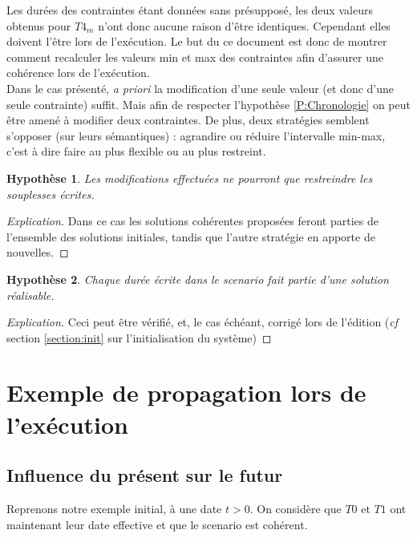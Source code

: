 \documentclass[10pt,a4paper]{article}
\newtheorem{presup}{Hypothèse}
\newcommand{\hyporef}[1]{l'hypothèse \ref{#1}}
\begin{document}
Les durées des contraintes étant données sans présupposé, les deux valeurs obtenus pour $T4_m$ n'ont donc aucune raison d'être identiques. Cependant elles doivent l'être lors de l'exécution. Le but du ce document est donc de montrer comment recalculer les valeurs min et max des contraintes afin d'assurer une cohérence lors de l'exécution.\\

Dans le cas présenté, \textit{a priori} la modification d'une seule valeur (et donc d'une seule contrainte) suffit. Mais afin de respecter \hyporef{P:Chronologie} on peut être amené à modifier deux contraintes. De plus, deux stratégies semblent s'opposer (sur leurs sémantiques) : agrandire ou réduire l'intervalle min-max, c'est à dire faire au plus flexible ou au plus restreint.

	\begin{presup}
		Les modifications effectuées ne pourront que restreindre les souplesses écrites. \label{P:modif}
	\end{presup}
	\begin{proof}[Explication]
		Dans ce cas les solutions cohérentes proposées feront parties de l'ensemble des solutions initiales, tandis que l'autre stratégie en apporte de nouvelles.
	\end{proof}

	\begin{presup}
		Chaque durée écrite dans le scenario fait partie d'une solution réalisable. \label{P:coherent}
	\end{presup}
	\begin{proof}[Explication]
		Ceci peut être vérifié, et, le cas échéant, corrigé lors de l'édition (\textit{cf} section \ref{section:init} sur l'initialisation du système)
	\end{proof}


\section{Exemple de propagation lors de l'exécution}

	\subsection{Influence du présent sur le futur}
Reprenons notre exemple initial, à une date $t>0$. On considère que $T0$ et $T1$ ont maintenant leur date effective et que le scenario est cohérent.
\end{document}
